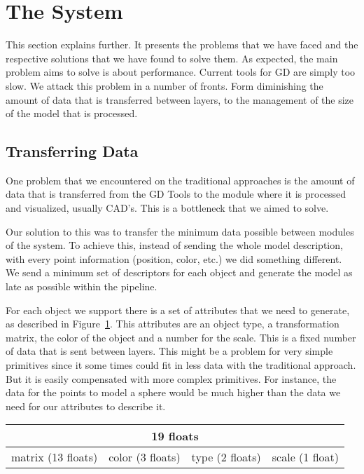 
\section{The System} %
\label{sec:the_system}

This section explains \TheName further. It presents the problems that we have faced and the respective solutions that we have found to solve them.
As expected, the main problem \TheName aims to solve is about performance. Current tools for \gls{GD} are simply too slow. We attack this problem in a number of fronts. Form diminishing the amount of data that is transferred between layers, to the management of the size of the model that is processed.

\subsection{Transferring Data} %
\label{sub:transferring_data}

One problem that we encountered on the traditional approaches is the amount of data that is transferred from the GD Tools to the module where it is processed and visualized, usually CAD's. 
This is a bottleneck that we aimed to solve.

Our solution to this was to transfer the minimum data possible between modules of the system. To achieve this, instead of sending the whole model description, with every point information (position, color, etc.) we did something different. We send a minimum set of descriptors for each object and generate the model as late as possible within the pipeline. 

For each object we support there is a set of attributes that we need to generate, as described in Figure~\ref{fig:datalayout}. This attributes are an object type, a transformation matrix, the color of the object and a number for the scale. This is a fixed number of data that is sent between layers. This might be a problem for very simple primitives since it some times could fit in less data with the traditional approach. But it is easily compensated with more complex primitives. For instance, the data for the points to model a sphere would be much higher than the data we need for our attributes to describe it.


\begin{table}[]
\centering
\begin{tabular}{|l|l|l|l|}
\hline
\multicolumn{4}{|c|}{19 floats}                                           \\ \hline
matrix (13 floats) & color (3 floats) & type (2 floats) & scale (1 float) \\ \hline
\end{tabular}
\label{fig:datalayout}
\end{table}

